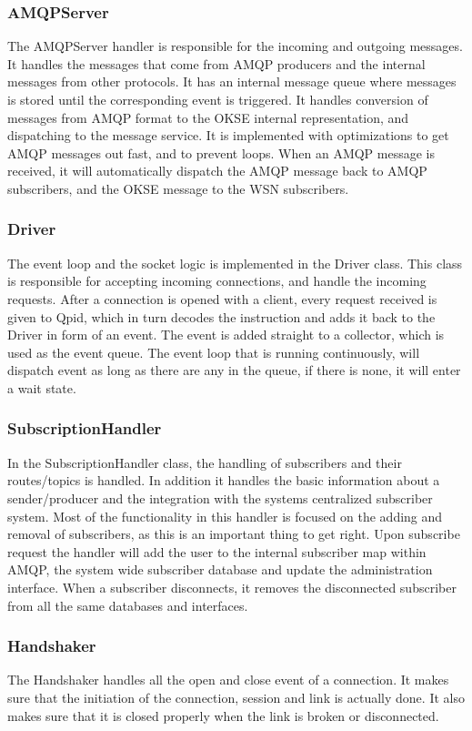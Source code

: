 \subsubsection{AMQPServer}
The AMQPServer handler is responsible for the incoming and outgoing messages. It handles the messages that come from AMQP producers and the internal messages from other protocols. It has an internal message queue where messages is stored until the corresponding event is triggered. It handles conversion of messages from AMQP format to the OKSE internal representation, and dispatching to the message service. It is implemented with optimizations to get AMQP messages out fast, and to prevent loops. When an AMQP message is received, it will automatically dispatch the AMQP message back to AMQP subscribers, and the OKSE message to the WSN subscribers.

\subsubsection{Driver}
The event loop and the socket logic is implemented in the Driver class. This class is responsible for accepting incoming connections, and handle the incoming requests. After a connection is opened with a client, every request received is given to Qpid, which in turn decodes the instruction and adds it back to the Driver in form of an event. The event is added straight to a collector, which is used as the event queue. The event loop that is running continuously, will dispatch event as long as there are any in the queue, if there is none, it will enter a wait state.

\subsubsection{SubscriptionHandler}
In the SubscriptionHandler class, the handling of subscribers and their routes/topics is handled. In addition it handles the basic information about a sender/producer and the integration with the systems centralized subscriber system. Most of the functionality in this handler is focused on the adding and removal of subscribers, as this is an important thing to get right. Upon subscribe request the handler will add the user to the internal subscriber map within AMQP, the system wide subscriber database and update the administration interface. When a subscriber disconnects, it removes the disconnected subscriber from all the same databases and interfaces.

\subsubsection{Handshaker}
The Handshaker handles all the open and close event of a connection. It makes sure that the initiation of the connection, session and link is actually done. It also makes sure that it is closed properly when the link is broken or disconnected.


